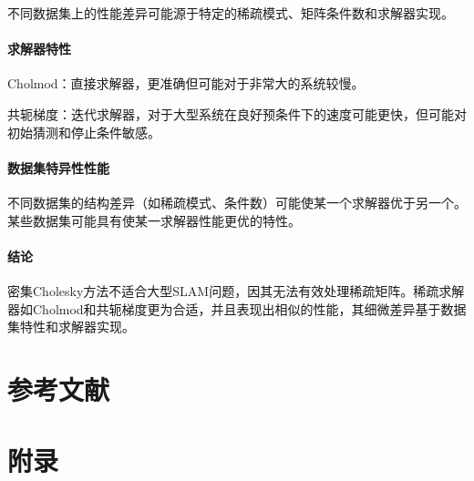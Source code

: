 \documentclass{ctexart}
\begin{document}
不同数据集上的性能差异可能源于特定的稀疏模式、矩阵条件数和求解器实现。

\paragraph{求解器特性}

Cholmod：直接求解器，更准确但可能对于非常大的系统较慢。

共轭梯度：迭代求解器，对于大型系统在良好预条件下的速度可能更快，但可能对初始猜测和停止条件敏感。

\paragraph{数据集特异性性能}

不同数据集的结构差异（如稀疏模式、条件数）可能使某一个求解器优于另一个。某些数据集可能具有使某一求解器性能更优的特性。

\paragraph{结论}

密集Cholesky方法不适合大型SLAM问题，因其无法有效处理稀疏矩阵。稀疏求解器如Cholmod和共轭梯度更为合适，并且表现出相似的性能，其细微差异基于数据集特性和求解器实现。

\section{参考文献}
\printbibliography

\section{附录}
\end{document}
